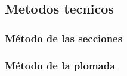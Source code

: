 \documentclass[
  16pt,
]{krantz}
\theoremstyle{definition}
\theoremstyle{definition}
\theoremstyle{definition}
\theoremstyle{definition}
\theoremstyle{remark}
\begin{document}
\hypertarget{metodos-tecnicos-1}{%
\subsection{Metodos tecnicos}\label{metodos-tecnicos-1}}

\hypertarget{muxe9todo-de-las-secciones}{%
\subsubsection{Método de las secciones}\label{muxe9todo-de-las-secciones}}

\hypertarget{muxe9todo-de-la-plomada-1}{%
\subsubsection{Método de la plomada}\label{muxe9todo-de-la-plomada-1}}

  

\printindex
\end{document}
